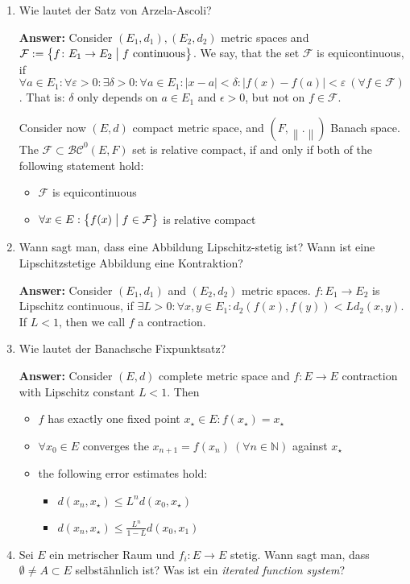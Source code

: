 \documentclass[11pt]{article}
\newcommand{\norm}[1]{\left\lVert#1\right\rVert}
\newcommand{\abs}[1]{\left|#1\right|}
\newcommand{\NN}[0]{\mathbb{N}}
\begin{document}
\begin{enumerate}
    \item Wie lautet der Satz von Arzela-Ascoli?

    \textbf{Answer:} Consider $(E_1, d_1), (E_2, d_2)$ metric spaces and $\mathcal{F} := \left\{f \colon E_1 \to E_2 \bigm| f\text{ continuous}\right\}$. We say, that the set $\mathcal{F}$ is equicontinuous, if $\forall a\in E_1\colon \forall \varepsilon > 0\colon \exists \delta > 0\colon \forall a\in E_1\colon \abs{x - a} < \delta\colon \abs{f(x) - f(a)} < \varepsilon~(\forall f \in \mathcal{F})$. That is: $\delta$ only depends on $a \in E_1$ and $\epsilon > 0$, but not on $f \in \mathcal{F}$.

    Consider now $(E, d)$ compact metric space, and $(F, \norm{.})$ Banach space. The $\mathcal{F} \subset \mathcal{BC}^0(E, F)$ set is relative compact, if and only if both of the following statement hold:
    \begin{itemize}
        \item $\mathcal{F}$ is equicontinuous
        \item $\forall x \in E: \left\{f(x) \bigm| f \in \mathcal{F}\right\}$ is relative compact
    \end{itemize}

    \item Wann sagt man, dass eine Abbildung Lipschitz-stetig ist? Wann ist eine Lipschitzstetige Abbildung eine Kontraktion?

    \textbf{Answer:} Consider $(E_1, d_1)$ and $(E_2, d_2)$ metric spaces. $f\colon E_1 \to E_2$ is Lipschitz continuous, if $\exists L > 0\colon \forall x, y\in E_1\colon d_2(f(x), f(y)) < L d_2(x, y)$. If $L < 1$, then we call $f$ a contraction.

    \item Wie lautet der Banachsche Fixpunktsatz?

    \textbf{Answer:} Consider $(E, d)$ complete metric space and $f\colon E \to E$ contraction with Lipschitz constant $L < 1$. Then
    \begin{itemize}
        \item $f$ has exactly one fixed point $x_\star \in E\colon f(x_\star) = x_\star$
        \item $\forall x_0 \in E$ converges the $x_{n+1} = f(x_n)~(\forall n \in \NN)$ against $x_\star$
        \item the following error estimates hold:
        \begin{itemize}
            \item $d(x_n, x_\star) \le L^n d(x_0, x_\star)$
            \item $d(x_n, x_\star) \le \frac{L^n}{1-L}d(x_0, x_1)$
        \end{itemize}
    \end{itemize}
    \item Sei $E$ ein metrischer Raum und $f_i \colon E \to E$ stetig. Wann sagt man, dass $\emptyset \neq A \subset E$ selbstähnlich ist? Was ist ein \textit{iterated function system}?


\end{enumerate}
\end{document}
